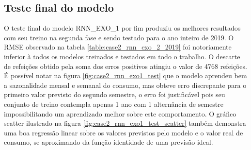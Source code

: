     \subsection{Teste final do modelo}
     O teste final do modelo RNN\_EXO\_1 por fim produziu os melhores resultados com seu treino na segunda fase e sendo testado para o ano inteiro de 2019. O RMSE observado na tabela \ref{table:case2_rnn_exo_2_2019} foi notoriamente inferior à todos os modelos treinados e testados em todo o trabalho.
     O descarte de refeições obtido pela soma dos erros positivos atingiu o valor de 4768 refeições.
     É possível notar na figura \ref{fig:case2_rnn_exo1_test} que o modelo aprendeu bem a sazonalidade mensal e semanal do consumo, mas obteve erro discrepante para o primeiro valor previsto do segundo semestre, o erro foi justificável pois seu conjunto de treino contempla apenas 1 ano com 1 alternância de semestre impossibilitando um aprendizado melhor sobre este comportamento.
     O gráfico scatter ilustrado na figura \ref{fig:case2_rnn_exo1_test_scatter} também demonstra uma boa regressão linear sobre os valores previstos pelo modelo e o valor real de consumo, se aproximando da função identidade de uma previsão ideal.
     
